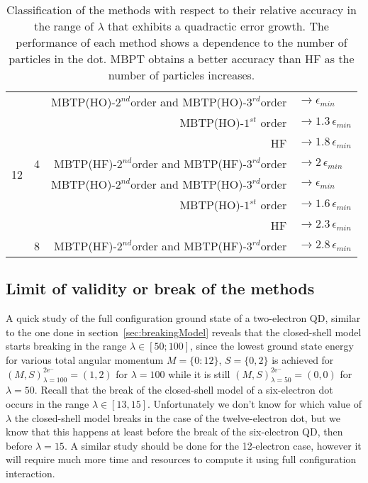 \begin{table}[ht]
{\begin{tabular}[c]{c|c|r l}
\hline
\multirow{8}{*}{12}& 	& MBTP(HO)-$2^{nd}$order and MBTP(HO)-$3^{rd}$order  & $\rightarrow \epsilon_{min}$ \\ 
		&	&    MBTP(HO)-$1^{st}$ order  & $\rightarrow 1.3\, \epsilon_{min}$ \\ 
		&	&    HF							& $\rightarrow 1.8 \, \epsilon_{min}$ \\ 
	& \multirow{-4}{*}{4}	&   MBTP(HF)-$2^{nd}$order and MBTP(HF)-$3^{rd}$order & $\rightarrow 2 \, \epsilon_{min}$ \\ \cline{2-4}
		&	& MBTP(HO)-$2^{nd}$order and MBTP(HO)-$3^{rd}$order   & $\rightarrow \epsilon_{min}$ \\ 
		&	&  MBTP(HO)-$1^{st}$ order	   & $\rightarrow 1.6 \, \epsilon_{min}$ \\
		&	&    HF							& $\rightarrow 2.3 \, \epsilon_{min}$ \\
	& \multirow{-4}{*}{8}	&    MBTP(HF)-$2^{nd}$order and MBTP(HF)-$3^{rd}$order & $\rightarrow 2.8\, \epsilon_{min}$ \\ 
\toprule[1pt]
\end{tabular}
}
 \caption{Classification of the methods with respect to their relative accuracy in the range of $\lambda$ that exhibits a quadractic error growth. The performance of each method shows a dependence to the number of particles in the dot. MBPT obtains a better accuracy than HF as the number of particles increases.}
\label{tab:relativeAccuracyMethods}
\end{table} 

\subsection{Limit of validity or break of the methods}
\label{sec:limitBreak}

A quick study of the full configuration ground state of a two-electron QD, similar to the one done in section~\ref{sec:breakingModel} reveals that the closed-shell model starts breaking in the range $\lambda \in [ 50;100]$,  since the lowest ground state energy for various total angular momentum $M=\{0:12\}$, $S=\{0,2\}$ is achieved for $(M,S)_{\lambda=100}^{2\text{e}^{-}}=(1,2)$ for $\lambda=100$ while it is still $(M,S)_{\lambda=50}^{2\text{e}^{-}}=(0,0)$ for $\lambda=50$.
Recall that the break of the closed-shell model of a six-electron dot occurs in the range $\lambda \in [13,15]$. Unfortunately we don't know for which value of $\lambda$ the closed-shell model breaks in the case of the twelve-electron dot, but we know that this happens at least before the break of the six-electron QD, then before $\lambda=15$. A similar study should be done for the 12-electron case, however it will require much more time and resources to compute it using full configuration interaction.

